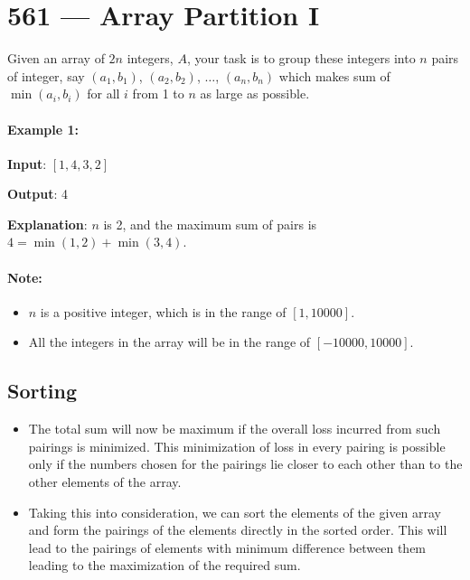 \section{561 --- Array Partition I}
Given an array of $2n$ integers, $A$, your task is to group these integers into $n$ pairs of integer, say $(a_1, b_1)$, $(a_2, b_2)$, $\ldots$, $(a_n, b_n)$ which makes sum of $\min(a_i, b_i)$ for all $i$ from 1 to $n$ as large as possible.

\paragraph{Example 1:}

\begin{flushleft}
\textbf{Input}: $ [1,4,3,2] $

\textbf{Output}: 4

\textbf{Explanation}: $n$ is 2, and the maximum sum of pairs is $4 = \min(1, 2) + \min(3, 4)$.

\end{flushleft}

\paragraph{Note:}
\begin{itemize}
\item $ n $ is a positive integer, which is in the range of $ [1, 10000] $.
\item All the integers in the array will be in the range of $ [-10000, 10000] $.
\end{itemize}

\subsection{Sorting}
\begin{itemize}
\item The total sum will now be maximum if the overall loss incurred from such pairings is minimized. This minimization of loss in every pairing is possible only if the numbers chosen for the pairings lie closer to each other than to the other elements of the array.
\item Taking this into consideration, we can sort the elements of the given array and form the pairings of the elements directly in the sorted order. This will lead to the pairings of elements with minimum difference between them leading to the maximization of the required sum.
\end{itemize}

